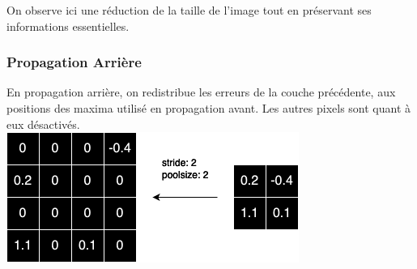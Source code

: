 \begin{multicols}{2}
On observe ici une réduction de la taille de l’image tout en préservant ses 
informations essentielles.

\subsubsection{Propagation Arrière}

En propagation arrière, on redistribue les erreurs de la couche précédente, aux positions des
maxima utilisé en propagation avant. Les autres pixels sont quant à eux désactivés. \\

\includegraphics[width=\columnwidth]{images/backwardpooling.png}
\hfill\break

\end{multicols}